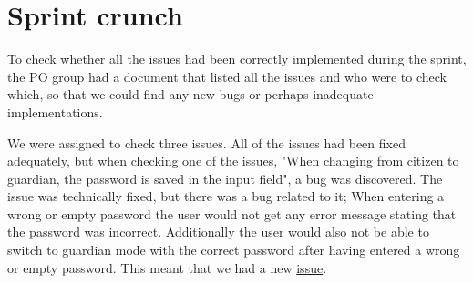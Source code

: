 \section{Sprint crunch}
To check whether all the issues had been correctly implemented during the sprint, the PO group had a document that listed all the issues and who were to check which, so that we could find any new bugs or perhaps inadequate implementations.

We were assigned to check three issues.
All of the issues had been fixed adequately, but when checking one of the \href{https://github.com/aau-giraf/weekplanner/issues/128}{issues}, "When changing from citizen to guardian, the password is saved in the input field", a bug was discovered.
The issue was technically fixed, but there was a bug related to it; When entering a wrong or empty password the user would not get any error message stating that the password was incorrect.
Additionally the user would also not be able to switch to guardian mode with the correct password after having entered a wrong or empty password.
This meant that we had a new \href{https://github.com/aau-giraf/weekplanner/issues/253}{issue}.
